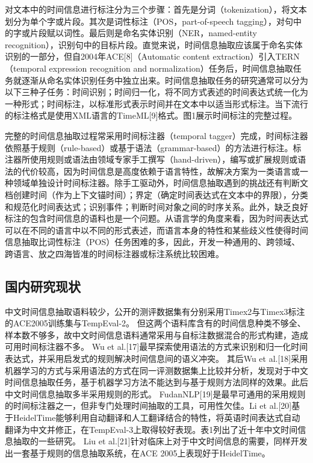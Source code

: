 对文本中的时间信息进行标注分为三个步骤：首先是分词（tokenization），将文本划分为单个字或片段。其次是词性标注（POS，part-of-speech tagging），对句中的字或片段赋以词性。最后则是命名实体识别（NER，named-entity recognition），识别句中的目标片段。直觉来说，时间信息抽取应该属于命名实体识别的一部分，但自2004年ACE[8]（Automatic content extraction）引入TERN（temporal expression recognition and normalization）任务后，时间信息抽取任务就逐渐从命名实体识别任务中独立出来。时间信息抽取任务的研究通常可以分为以下三种子任务：时间识别；时间归一化，将不同方式表述的时间表达式统一化为一种形式；时间标注，以标准形式表示时间并在文本中以适当形式标注。当下流行的标注格式是使用XML语言的TimeML[9]格式。图1展示时间标注的完整过程。

完整的时间信息抽取过程常采用时间标注器（temporal tagger）完成，时间标注器依照基于规则（rule-based）或基于语法（grammar-based）的方法进行标注。标注器所使用规则或语法由领域专家手工撰写（hand-driven），编写或扩展规则或语法的代价较高，因为时间信息是高度依赖于语言特性，故解决方案为一类语言或一种领域单独设计时间标注器。除手工驱动外，时间信息抽取遇到的挑战还有判断文档创建时间（作为上下文锚时间）；界定（确定时间表达式在文本中的界限），分类和规范化时间表达式；识别事件；判断时间对象之间的时序关系。此外，缺乏良好标注的包含时间信息的语料也是一个问题。从语言学的角度来看，因为时间表达式可以在不同的语言中以不同的形式表述，而语言本身的特性和某些歧义性使得时间信息抽取比词性标注（POS）任务困难的多，因此，开发一种通用的、跨领域、跨语言、放之四海皆准的时间标注器或标注系统比较困难。

\subsection{国内研究现状}

中文时间信息抽取语料较少，公开的测评数据集有分别采用Timex2与Timex3标注的ACE2005训练集与TempEval-2。
但这两个语料库含有的时间信息种类不够全、样本数不够多，故中文时间信息语料通常采用与自标注数据混合的形式构建，造成可用时间标注器不多。
Wu et al.[17]最早探索使用语法的方式来识别和归一化时间表达式，并采用启发式的规则解决时间信息间的语义冲突。
其后Wu et al.[18]采用机器学习的方式与采用语法的方式在同一评测数据集上比较并分析，发现对于中文时间信息抽取任务，基于机器学习方法不能达到与基于规则方法同样的效果。此后中文时间信息抽取多半采用规则的形式。
FudanNLP[19]是最早可通用的采用规则的时间标注器之一，但非专门处理时间抽取的工具，可用性欠佳。Li et al.[20]基于HeidelTime能够利用自动翻译和人工翻译结合的特性，将英语时间表达式自动翻译为中文并修正，在TempEval-3上取得较好表现。表1列出了近十年中文时间信息抽取的一些研究。
Liu et al.[21]针对临床上对于中文时间信息的需要，同样开发出一套基于规则的信息抽取系统，在ACE 2005上表现好于HeidelTime。

